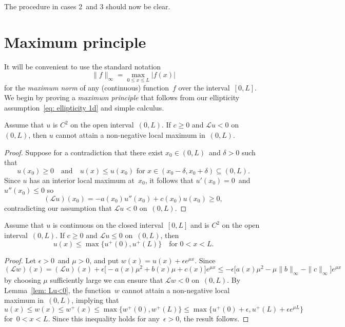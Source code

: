 The procedure in cases 2~and 3 should now be clear.

\section{Maximum principle}
It will be convenient to use the standard notation
\[
\|f\|_\infty=\max_{0\le x\le L}|f(x)|
\]
for the \emph{maximum norm} of any (continuous) function~$f$ over 
the interval~$[0,L]$.  We begin by proving a \emph{maximum principle} that 
follows from our ellipticity assumption~\eqref{eq: ellipticity 1d} and simple 
calculus.

\begin{lemma}\label{lem: Lu<0}
Assume that $u$ is $C^2$ on the open interval~$(0,L)$.
If $c\ge0$ and $\mathcal{L}u<0$ on~$(0,L)$, then $u$ cannot attain a 
non-negative local maximum in~$(0,L)$.
\end{lemma}
\begin{proof}
Suppose for a contradiction that there exist $x_0\in(0,L)$~and $\delta>0$ such
that
\[
u(x_0)\ge0\quad\text{and}\quad
\text{$u(x)\le u(x_0)$ for~$x\in(x_0-\delta,x_0+\delta)\subseteq(0,L)$.}
\]
Since $u$ has an interior local maximum at~$x_0$, it follows that 
$u'(x_0)=0$~and $u''(x_0)\le0$ so 
\[
(\mathcal{L}u)(x_0)=-a(x_0)u''(x_0)+c(x_0)u(x_0)\ge 0,
\]
contradicting our assumption that $\mathcal{L}u<0$ on~$(0,L)$.
\end{proof}



\begin{theorem}\label{thm: max principle 1d}
Assume that $u$ is continuous on the closed interval~$[0,L]$ and is $C^2$ on 
the open interval~$(0,L)$. If $c\ge0$ and $\mathcal{L}u\le0$ on~$(0,L)$, then
\[
u(x)\le\max\{u^+(0),u^+(L)\}\quad\text{for $0<x<L$.}
\]
\end{theorem}
\begin{proof}
Let $\epsilon>0$~and $\mu>0$, and put $w(x)=u(x)+\epsilon e^{\mu x}$.  Since
\[
(\mathcal{L}w)(x)
	=(\mathcal{L}u)(x)+\epsilon\bigl[-a(x)\mu^2+b(x)\mu+c(x)\bigr]e^{\mu x}
	\le-\epsilon\bigl[a(x)\mu^2-\mu\|b\|_\infty-\|c\|_\infty\bigr]e^{\mu x}
\]
by choosing $\mu$ sufficiently large we can ensure that $\mathcal{L}w<0$
on~$(0,L)$.  By Lemma~\ref{lem: Lu<0}, the function~$w$ cannot attain a 
non-negative local maximum in~$(0,L)$, implying that 
\[
u(x)\le w(x)\le w^+(x)\le\max\{w^+(0),w^+(L)\}
	\le\max\{u^+(0)+\epsilon,u^+(L)+\epsilon e^{\mu L}\}
\]
for~$0<x<L$.  Since this inequality holds for any~$\epsilon>0$, the result 
follows.
\end{proof}

